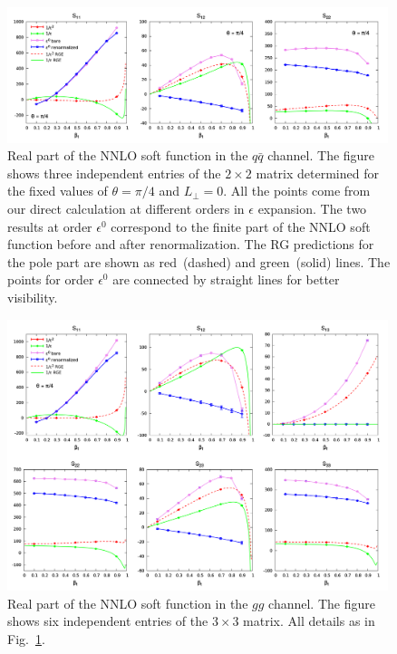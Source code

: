 \documentclass[a4paper,11pt]{article}
\newcommand{\qqbar}{{\ensuremath{q \bar q}}\xspace}
\newcommand{\LT}{L_\perp}
\numberwithin{equation}{section}
\begin{document}
\begin{figure}[t]
  \begin{center}
    \includegraphics[width=0.99\textwidth]{plots/soft-function-qq-re-beta.png}
  \end{center}
  \caption{
  Real part of the NNLO soft function in the \qqbar channel.
  The figure shows three independent entries of the $2\times 2$ matrix
  determined for the fixed values of $\theta = \pi/4$ and $\LT = 0$.
  All the points come from our direct calculation at different orders in
  $\epsilon$ expansion. The two results at order $\epsilon^0$ correspond to the
  finite part of the NNLO soft function before and after renormalization.
  The RG predictions for the pole part are shown as
  red~(dashed) and green~(solid) lines.
  The points for order $\epsilon^0$ are connected by straight lines for better
  visibility.
  }
  \label{fig:SFresqqreal}
\end{figure}

\begin{figure}[!t]
  \begin{center}
    \includegraphics[width=0.99\textwidth]{plots/soft-function-gg-re-beta.png}
  \end{center}
  \caption{
  Real part of the NNLO soft function in the $gg$ channel.  The figure shows six
  independent entries of the $3\times 3$ matrix. All details as in
  Fig.~\ref{fig:SFresqqreal}.
  }
  \label{fig:SFresggreal}
\end{figure}
\end{document}
